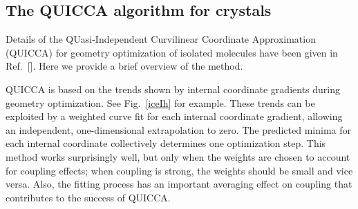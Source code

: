 \twolinestyle{\documentclass[prb,preprint]{revtex4}}
\begin{document}

\subsection{The QUICCA algorithm for crystals} 

Details of the QUasi-Independent Curvilinear Coordinate Approximation 
(QUICCA) for geometry optimization of isolated molecules have been 
given in Ref.~[].  Here we provide a brief overview 
of the method.  

QUICCA is based on the trends shown by internal coordinate 
gradients during geometry optimization.  See Fig.~\ref{iceIh} for example.
These trends can be exploited by a weighted curve fit for each internal 
coordinate gradient,  allowing an independent, one-dimensional extrapolation 
to zero. The predicted minima for each internal coordinate  collectively 
determines one optimization step.  This method works surprisingly well, but 
only when the weights are chosen to account for coupling effects;  when 
coupling is strong, the weights should be small and vice versa.  Also, the
fitting process has an important averaging effect on coupling that contributes 
to the success of QUICCA.
\end{document}

